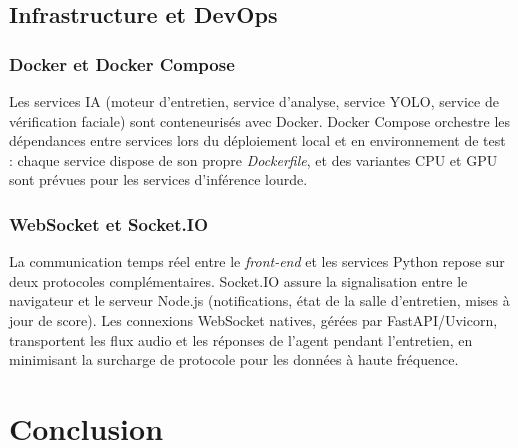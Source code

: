 
\subsection{Infrastructure et DevOps}

\subsubsection{Docker et Docker Compose}

Les services IA (moteur d'entretien, service d'analyse, service YOLO, service de vérification faciale) sont conteneurisés avec Docker. Docker Compose orchestre les dépendances entre services lors du déploiement local et en environnement de test : chaque service dispose de son propre \textit{Dockerfile}, et des variantes CPU et GPU sont prévues pour les services d'inférence lourde.


\subsubsection{WebSocket et Socket.IO}

La communication temps réel entre le \textit{front-end} et les services Python repose sur deux protocoles complémentaires. Socket.IO assure la signalisation entre le navigateur et le serveur Node.js (notifications, état de la salle d'entretien, mises à jour de score). Les connexions WebSocket natives, gérées par FastAPI/Uvicorn, transportent les flux audio et les réponses de l'agent pendant l'entretien, en minimisant la surcharge de protocole pour les données à haute fréquence.


\section{Conclusion}

